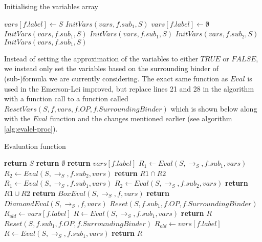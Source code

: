 \documentclass[10pt,a4paper]{article}
\begin{document}
\begin{algorithm}[H]
\caption{Initialising the variables array}\label{alg:init-proc}
\begin{algorithmic}[1]
			\State $vars[f.label] \gets S$
			\State $InitVars(vars,f.sub_1,S)$
			\State $vars[f.label] \gets \emptyset$
			\State $InitVars(vars,f.sub_1,S)$
		\Else
				\State $InitVars(vars,f.sub_1,S)$
				\State $InitVars(vars,f.sub_2,S)$
				\State $InitVars(vars,f.sub_1,S)$
			\EndIf
		\EndIf
	\EndProcedure
\end{algorithmic}
\end{algorithm}

\noindent Instead of setting the approximation of the variables to either $TRUE$ or $FALSE$, we instead only set the variables based on the surrounding binder of (sub-)formula we are currently considering. The exact same function as $Eval$ is used in the Emerson-Lei improved, but replace lines 21 and 28 in the algorithm with a function call to a function called \\
$ResetVars(S,f, vars, f.OP, f.SurroundingBinder)$ which is shown below along with the $Eval$ function and the changes mentioned earlier (see algorithm \ref{alg:evalel-proc}).

\begin{algorithm}[H]
\caption{Evaluation function}\label{alg:evalel-proc}
\begin{algorithmic}[1]
        	\State \textbf{return} $S$ 
			\State \textbf{return} $\emptyset$ 
			\State \textbf{return} $vars[f.label]$ 
        	\State $R_1 \gets Eval(S,\to_S,f.sub_1,vars)$ 
        	\State $R_2 \gets Eval(S,\to_S,f.sub_2,vars)$ 
			\State \textbf{return} $R1 \cap R2$ 
        	\State $R_1 \gets Eval(S,\to_S,f.sub_1,vars)$ 
        	\State $R_2 \gets Eval(S,\to_S,f.sub_2,vars)$ 
			\State \textbf{return} $R1 \cup R2$ 
			\State \textbf{return} $BoxEval(S,\to_S,f,vars)$ 
			\State \textbf{return} $DiamondEval(S,\to_S,f,vars)$ 
        		\State $Reset(S, f.sub_1, f.OP, f.SurroundingBinder)$
        	\EndIf
			\Repeat
				\State $R_{old} \gets vars[f.label]$
				\State $R \gets Eval(S,\to_S,f.sub_1,vars)$
			\State \textbf{return} $R$ 	
        		\State $Reset(S, f.sub_1, f.OP, f.SurroundingBinder)$
        	\EndIf 
			\Repeat
				\State $R_{old} \gets vars[f.label]$
				\State $R \gets Eval(S,\to_S,f.sub_1,vars)$
			\State \textbf{return} $R$ 		
        \EndIf
	\EndProcedure
\end{algorithmic}
\end{algorithm}
\end{document}
